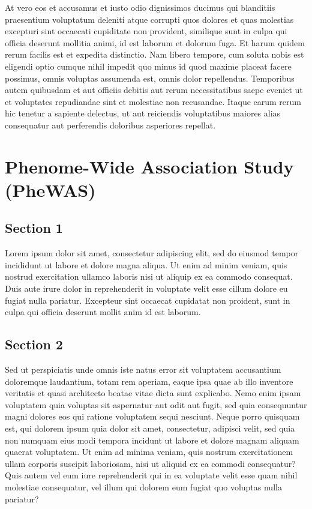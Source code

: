 \documentclass[
]{book}
\begin{document}
At vero eos et accusamus et iusto odio dignissimos ducimus qui blanditiis praesentium voluptatum deleniti atque corrupti quos dolores et quas molestias excepturi sint occaecati cupiditate non provident, similique sunt in culpa qui officia deserunt mollitia animi, id est laborum et dolorum fuga. Et harum quidem rerum facilis est et expedita distinctio. Nam libero tempore, cum soluta nobis est eligendi optio cumque nihil impedit quo minus id quod maxime placeat facere possimus, omnis voluptas assumenda est, omnis dolor repellendus. Temporibus autem quibusdam et aut officiis debitis aut rerum necessitatibus saepe eveniet ut et voluptates repudiandae sint et molestiae non recusandae. Itaque earum rerum hic tenetur a sapiente delectus, ut aut reiciendis voluptatibus maiores alias consequatur aut perferendis doloribus asperiores repellat.

\hypertarget{phenome-wide-association-study-phewas}{%
\chapter{Phenome-Wide Association Study (PheWAS)}\label{phenome-wide-association-study-phewas}}

\hypertarget{section-1-6}{%
\section{Section 1}\label{section-1-6}}

Lorem ipsum dolor sit amet, consectetur adipiscing elit, sed do eiusmod tempor incididunt ut labore et dolore magna aliqua. Ut enim ad minim veniam, quis nostrud exercitation ullamco laboris nisi ut aliquip ex ea commodo consequat. Duis aute irure dolor in reprehenderit in voluptate velit esse cillum dolore eu fugiat nulla pariatur. Excepteur sint occaecat cupidatat non proident, sunt in culpa qui officia deserunt mollit anim id est laborum.

\hypertarget{section-2-6}{%
\section{Section 2}\label{section-2-6}}

Sed ut perspiciatis unde omnis iste natus error sit voluptatem accusantium doloremque laudantium, totam rem aperiam, eaque ipsa quae ab illo inventore veritatis et quasi architecto beatae vitae dicta sunt explicabo. Nemo enim ipsam voluptatem quia voluptas sit aspernatur aut odit aut fugit, sed quia consequuntur magni dolores eos qui ratione voluptatem sequi nesciunt. Neque porro quisquam est, qui dolorem ipsum quia dolor sit amet, consectetur, adipisci velit, sed quia non numquam eius modi tempora incidunt ut labore et dolore magnam aliquam quaerat voluptatem. Ut enim ad minima veniam, quis nostrum exercitationem ullam corporis suscipit laboriosam, nisi ut aliquid ex ea commodi consequatur? Quis autem vel eum iure reprehenderit qui in ea voluptate velit esse quam nihil molestiae consequatur, vel illum qui dolorem eum fugiat quo voluptas nulla pariatur?
\end{document}

